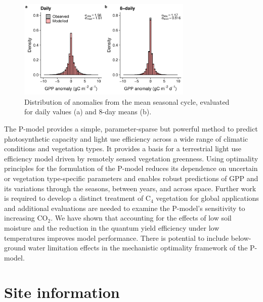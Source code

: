 \documentclass[gmd, manuscript]{copernicus}
\newcommand{\coo}{CO$_2$}
\begin{document}
\begin{figure}[t]
\includegraphics[width=8.3cm]{fig/hist_anomalies.pdf}
    \caption{Distribution of anomalies from the mean seasonal cycle, evaluated for daily values (a) and 8-day means (b).} 
    \label{fig:modobs_anomalies}
\end{figure}


\conclusions
The P-model provides a simple, parameter-sparse but powerful method to predict photosynthetic capacity and light use efficiency across a wide range of climatic conditions and vegetation types. It provides a basis for a terrestrial light use efficiency model driven by remotely sensed vegetation greenness. Using optimality principles for the formulation of the P-model reduces its dependence on uncertain or vegetation type-specific parameters and enables robust predictions of GPP and its variations through the seasons, between years, and across space. Further work is required to develop a distinct treatment of C$_4$ vegetation for global applications and additional evaluations are needed to examine the P-model's sensitivity to increasing \coo . We have shown that accounting for the effects of low soil moisture and the reduction in the quantum yield efficiency under low temperatures improves model performance. There is potential to include below-ground water limitation effects in the mechanistic optimality framework of the P-model. 



\appendix
\section{Site information}
\end{document}
